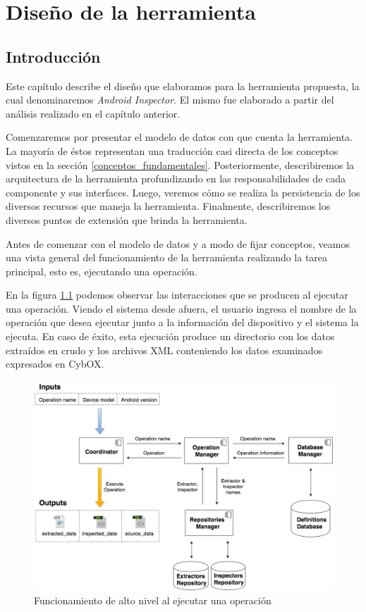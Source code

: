 \chapter{Diseño de la herramienta} \label{chap:Disenio}

\section{Introducción}
Este capítulo describe el diseño que elaboramos para la herramienta propuesta, la cual denominaremos \emph{Android Inspector}. El mismo fue elaborado a partir del análisis realizado en el capítulo anterior.

Comenzaremos por presentar el modelo de datos con que cuenta la herramienta. La mayoría de éstos representan una traducción casi directa de los conceptos vistos en la sección \ref{conceptos_fundamentales}. Posteriormente, describiremos la arquitectura de la herramienta profundizando en las responsabilidades de cada componente y sus interfaces. Luego, veremos cómo se realiza la persistencia de los diversos recursos que maneja la herramienta. Finalmente, describiremos los diversos puntos de extensión que brinda la herramienta.

Antes de comenzar con el modelo de datos y a modo de fijar conceptos, veamos una vista general del funcionamiento de la herramienta realizando la tarea principal, esto es, ejecutando una operación.

En la figura \ref{DiagramaFuncionamientoAltoNivel} podemos observar las interacciones que se producen al ejecutar una operación. Viendo el sistema desde afuera, el usuario ingresa el nombre de la operación que desea ejecutar junto a la información del dispositivo y el sistema la ejecuta. En caso de éxito, esta ejecución produce un directorio con los datos extraídos en crudo y los archivos XML conteniendo los datos examinados expresados en CybOX.

\begin{figure}[H]
    \begin{center}
        \includegraphics[width=\textwidth]{figures/diagrama_flujo_de_trabajo}
        \caption{Funcionamiento de alto nivel al ejecutar una operación}
        \label{DiagramaFuncionamientoAltoNivel}
    \end{center}
\end{figure}


